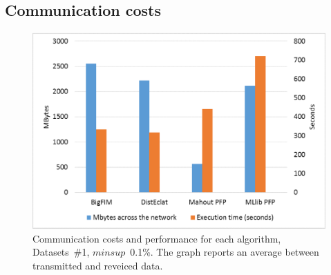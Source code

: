 \subsection{Communication costs}
\label{survey_communication_costs}

\begin{figure}[!t]
\begin{center}
\includegraphics[width=5in]{comm_costs.eps}
\caption{Communication costs and performance for each algorithm,
Datasets~\#1, $minsup$~0.1\%.
The graph reports an average between transmitted and reveiced data.}
\label{comm_costs}
\end{center}
\end{figure}

%

